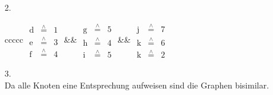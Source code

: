 \documentclass[a4paper,11pt,fleqn]{scrartcl}
\begin{document}
\begin{enumerate}
\begin{enumerate}
\begin{tabular}{ccc}
\begin{tikzpicture}[>=stealth',
									shorten >=1pt,
									auto,
									node distance=2.5cm,
									every path/.style={->},
									every state/.style={circle, draw, minimum size = 0.75cm}]
				\end{tikzpicture}				
			\end{tabular} \\ \\
			\item[2.] \quad \\
			\begin{tabular}{ccccc}
				\(
				\begin{array}{ccc}
					\text{d} & \overset{\wedge}{=} & 1 \\
					\text{e} & \overset{\wedge}{=} & 3 \\
					\text{f} & \overset{\wedge}{=} & 4
				\end{array}
				\)
				&\quad \quad \quad &
				\(
				\begin{array}{ccc}
					\text{g} & \overset{\wedge}{=} & 5 \\
					\text{h} & \overset{\wedge}{=} & 4 \\
					\text{i} & \overset{\wedge}{=} & 5 
				\end{array}
				\)
				&\quad \quad \quad &
				\(
				\begin{array}{ccc}
					\text{j} & \overset{\wedge}{=} & 7 \\
					\text{k} & \overset{\wedge}{=} & 6 \\
					\text{k} & \overset{\wedge}{=} & 2 
				\end{array}
				\)
			\end{tabular}
			\item[3.] \quad \\
				Da alle Knoten eine Entsprechung aufweisen sind die Graphen bisimilar.
			

\end{enumerate}
\end{enumerate}
\end{document}
